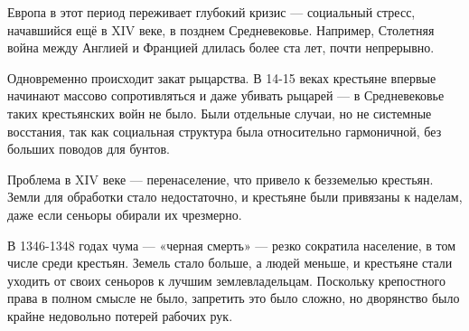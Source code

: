 
Европа в этот период переживает глубокий кризис --- социальный стресс, начавшийся ещё в XIV веке, в позднем Средневековье. Например, Столетняя война между Англией и Францией длилась более ста лет, почти непрерывно.

Одновременно происходит закат рыцарства. В 14-15 веках крестьяне впервые начинают массово сопротивляться и даже убивать рыцарей --- в Средневековье таких крестьянских войн не было. Были отдельные случаи, но не системные восстания, так как социальная структура была относительно гармоничной, без больших поводов для бунтов.

Проблема в XIV веке --- перенаселение, что привело к безземелью крестьян. Земли для обработки стало недостаточно, и крестьяне были привязаны к наделам, даже если сеньоры обирали их чрезмерно.

В 1346-1348 годах чума --- «черная смерть» --- резко сократила население, в том числе среди крестьян. Земель стало больше, а людей меньше, и крестьяне стали уходить от своих сеньоров к лучшим землевладельцам. Поскольку крепостного права в полном смысле не было, запретить это было сложно, но дворянство было крайне недовольно потерей рабочих рук.

